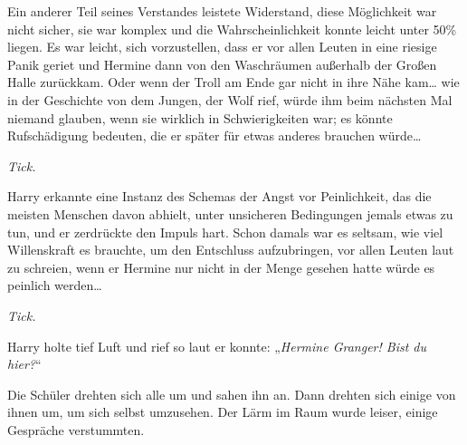 Ein anderer Teil seines Verstandes leistete Widerstand, diese Möglichkeit war nicht sicher, sie war komplex und die Wahrscheinlichkeit konnte leicht unter 50\% liegen. Es war leicht, sich vorzustellen, dass er vor allen Leuten in eine riesige Panik geriet und Hermine dann von den Waschräumen außerhalb der Großen Halle zurückkam. Oder wenn der Troll am Ende gar nicht in ihre Nähe kam… wie in der Geschichte von dem Jungen, der Wolf rief, würde ihm beim nächsten Mal niemand glauben, wenn sie wirklich in Schwierigkeiten war; es könnte Rufschädigung bedeuten, die er später für etwas anderes brauchen würde…

\emph{Tick.}

Harry erkannte eine Instanz des Schemas der Angst vor Peinlichkeit, das die meisten Menschen davon abhielt, unter unsicheren Bedingungen jemals etwas zu tun, und er zerdrückte den Impuls hart. Schon damals war es seltsam, wie viel Willenskraft es brauchte, um den Entschluss aufzubringen, vor allen Leuten laut zu schreien, wenn er Hermine nur nicht in der Menge gesehen hatte würde es peinlich werden…

\emph{Tick.}

Harry holte tief Luft und rief so laut er konnte: „\emph{Hermine Granger! Bist du hier?}“

Die Schüler drehten sich alle um und sahen ihn an. Dann drehten sich einige von ihnen um, um sich selbst umzusehen. Der Lärm im Raum wurde leiser, einige Gespräche verstummten.

